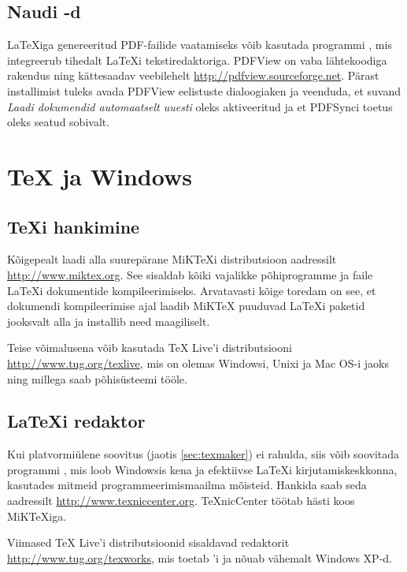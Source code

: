 \subsection{Naudi -d}

\LaTeX iga genereeritud PDF-failide vaatamiseks võib kasutada programmi
, mis integreerub tihedalt \LaTeX i tekstiredaktoriga.
PDFView on vaba lähtekoodiga rakendus ning kättesaadav veebilehelt
\url{http://pdfview.sourceforge.net}. Pärast installimist tuleks avada
PDFView eelistuste dialoogiaken ja veenduda, et suvand \emph{Laadi
dokumendid automaatselt uuesti} oleks aktiveeritud ja et PDFSynci toetus
oleks seatud sobivalt.

\section{\TeX{} ja Windows}

\subsection{\TeX i hankimine}

Kõigepealt laadi alla suurepärane MiK\TeX i
distributsioon aadressilt \url{http://www.miktex.org}. See sisaldab
kõiki vajalikke põhiprogramme ja faile \LaTeX i dokumentide
kompileerimiseks. Arvatavasti kõige toredam on see, et dokumendi
kompileerimise ajal laadib MiK\TeX{} puuduvad \LaTeX i paketid jooksvalt
alla ja installib need maagiliselt.

Teise võimalusena võib kasutada \TeX{} Live'i
distributsiooni \url{http://www.tug.org/texlive}, mis on olemas
Windowsi, Unixi ja Mac OS-i jaoks ning millega saab põhisüsteemi tööle.

\subsection{\LaTeX i redaktor}

Kui platvormiülene soovitus  (jaotis \ref{sec:texmaker}) ei
rahulda, siis võib soovitada programmi , mis loob
Windowsis kena ja efektiivse \LaTeX i kirjutamiskeskkonna, kasutades
mitmeid programmeerimismaailma mõisteid. Hankida saab seda aadressilt
\url{http://www.texniccenter.org}. TeXnicCenter töötab hästi koos
MiK\TeX iga.

Viimased \TeX{} Live'i distributsioonid
sisaldavad redaktorit  \url{http://www.tug.org/texworks},
mis toetab 'i ja nõuab vähemalt Windows XP-d.

